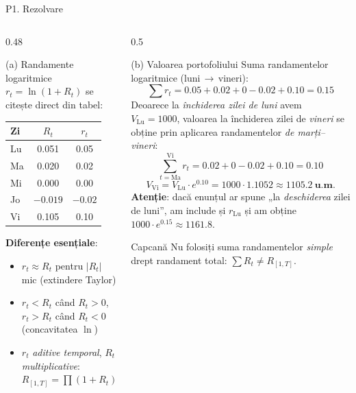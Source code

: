 \documentclass[9pt, aspectratio=169, t]{beamer}
\begin{document}
\begin{frame}[shrink=22]{P1. Rezolvare}
\begin{columns}[T]
\begin{column}{0.48\textwidth}
\begin{block}{(a) Randamente logaritmice}
$r_t = \ln(1+R_t)$ se citește direct din tabel:
\begin{center}\small
\begin{tabular}{lcc}\toprule
Zi & $R_t$ & $r_t$\\\midrule
Lu & 0.051 & 0.05\\
Ma & 0.020 & 0.02\\
Mi & 0.000 & 0.00\\
Jo & $-0.019$ & $-0.02$\\
Vi & 0.105 & 0.10\\\bottomrule
\end{tabular}
\end{center}
\textbf{Diferențe esențiale}:
\begin{itemize}\setlength{\itemsep}{0pt}
    \item $r_t \approx R_t$ pentru $|R_t|$ mic (extindere Taylor)
    \item $r_t < R_t$ când $R_t > 0$, $r_t > R_t$ când $R_t<0$ (concavitatea $\ln$)
    \item $r_t$ \emph{aditive temporal}, $R_t$ \emph{multiplicative}: $R_{[1,T]}=\prod(1+R_t)-1$
\end{itemize}
\end{block}
\end{column}
\begin{column}{0.5\textwidth}
\begin{block}{(b) Valoarea portofoliului}
Suma randamentelor logaritmice (luni\,$\to$\,vineri):
\[
\sum r_t = 0.05+0.02+0-0.02+0.10 = 0.15
\]
Deoarece la \emph{închiderea zilei de luni} avem $V_{\text{Lu}}=1000$, valoarea la închiderea zilei de \emph{vineri} se obține prin aplicarea randamentelor \emph{de marți--vineri}:
\[
\sum_{t=\text{Ma}}^{\text{Vi}} r_t = 0.02+0-0.02+0.10 = 0.10
\]
\[
V_{\text{Vi}} = V_{\text{Lu}}\cdot e^{0.10} = 1000\cdot 1.1052 \approx \mathbf{1105.2\ \text{u.m.}}
\]
\textbf{Atenție}: dacă enunțul ar spune „la \emph{deschiderea} zilei de luni'', am include și $r_{\text{Lu}}$ și am obține $1000\cdot e^{0.15}\approx 1161.8$.
\end{block}
\begin{alertblock}{Capcană}
Nu folosiți suma randamentelor \emph{simple} drept randament total: $\sum R_t \neq R_{[1,T]}$.
\end{alertblock}
\end{column}
\end{columns}
\end{frame}
\end{document}
